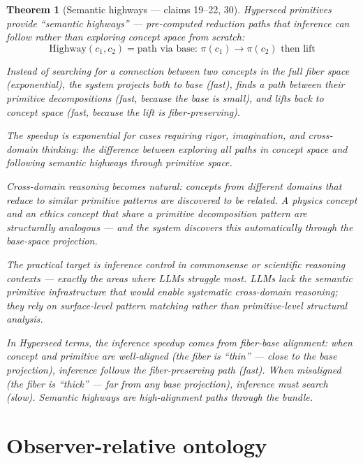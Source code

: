 \documentclass[11pt,a4paper]{article}
\newtheorem{theorem}[definition]{Theorem}
\begin{document}
\begin{theorem}[Semantic highways --- claims 19--22, 30]
\label{thm:highways}
Hyperseed primitives provide ``semantic highways'' --- pre-computed
reduction paths that inference can follow rather than exploring concept
space from scratch:
\[
  \text{Highway}(c_1, c_2) = \text{path via base: }
  \pi(c_1) \to \pi(c_2) \text{ then lift}
\]

Instead of searching for a connection between two concepts in the full
fiber space (exponential), the system projects both to base (fast),
finds a path between their primitive decompositions (fast, because
the base is small), and lifts back to concept space (fast, because
the lift is fiber-preserving).

The speedup is exponential for cases requiring rigor, imagination, and
cross-domain thinking: the difference between exploring all paths in
concept space and following semantic highways through primitive space.

Cross-domain reasoning becomes natural: concepts from different domains
that reduce to similar primitive patterns are discovered to be related.
A physics concept and an ethics concept that share a primitive
decomposition pattern are structurally analogous --- and the system
discovers this automatically through the base-space projection.

The practical target is inference control in commonsense or scientific
reasoning contexts --- exactly the areas where LLMs struggle most.
LLMs lack the semantic primitive infrastructure that would enable
systematic cross-domain reasoning; they rely on surface-level pattern
matching rather than primitive-level structural analysis.

In Hyperseed terms, the inference speedup comes from fiber-base
alignment: when concept and primitive are well-aligned (the fiber
is ``thin'' --- close to the base projection), inference follows the
fiber-preserving path (fast). When misaligned (the fiber is ``thick''
--- far from any base projection), inference must search (slow).
Semantic highways are high-alignment paths through the bundle.
\end{theorem}

\section{Observer-relative ontology}
\label{sec:relative}
\end{document}
